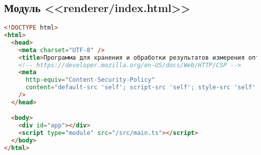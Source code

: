 \subsection{Модуль <<renderer/index.html>>}
\begin{lstlisting}[language=HTML]
<!DOCTYPE html>
<html>
  <head>
    <meta charset="UTF-8" />
    <title>Программа для хранения и обработки результатов измерения оптических рефлектометров</title>
    <!-- https://developer.mozilla.org/en-US/docs/Web/HTTP/CSP -->
    <meta
      http-equiv="Content-Security-Policy"
      content="default-src 'self'; script-src 'self'; style-src 'self' 'unsafe-inline'"
    />
  </head>

  <body>
    <div id="app"></div>
    <script type="module" src="/src/main.ts"></script>
  </body>
</html>  
\end{lstlisting}
